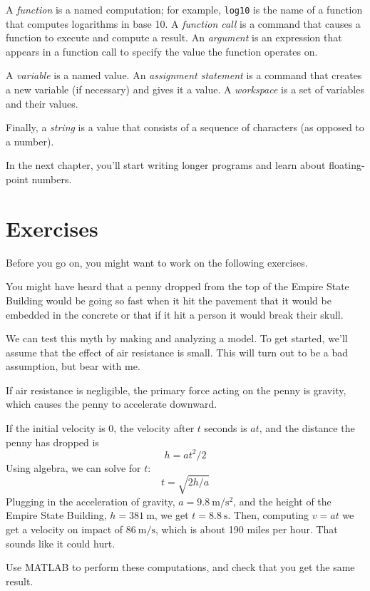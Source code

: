 A \emph{function} is a named computation; for example, \lstinline{log10} is the
name of a function that computes logarithms in base 10.
A \emph{function call} is a command that causes a function to execute and compute a result.
An \emph{argument} is an expression that appears in a function call to
specify the value the function operates on.

A \emph{variable} is a named value. An \emph{assignment statement} is a command that creates a new variable (if necessary) and gives it a value.
A \emph{workspace} is a set of variables and their values.

Finally, a \emph{string} is a value that consists of a sequence of characters (as opposed to a number).

In the next chapter, you'll start writing longer programs and learn about floating-point numbers.

\section{Exercises}

Before you go on, you might want to work on the following exercises.

\begin{ex}
\label{penny}
You might have heard that a penny dropped from the top of the Empire State Building would be going so fast when it hit the pavement that it would be embedded in the concrete or that if it hit a person it would break their skull.


We can test this myth by making and analyzing a model.  To get started, we'll assume that the effect of air resistance is small.  This will turn out to be a bad assumption, but bear with me.

If air resistance is negligible, the primary force acting on the penny is gravity, which causes the penny to accelerate downward.


If the initial velocity is 0, the velocity after $t$ seconds is $a t$, and the distance the penny has dropped is
%
\[ h = a t^2 / 2 \]
%
Using algebra, we can solve for $t$:
%
\[ t = \sqrt{ 2 h / a} \]
%
Plugging in the acceleration of gravity,
$a = \SI{9.8}{\meter\per\second\squared}$, and the height of the Empire State Building,
$h = \SI{381}{\meter}$, we get
$t = \SI{8.8}{\second}$.
Then, computing $v = a t$ we get a velocity on impact of $\SI{86}{\meter\per\second}$, which is about 190 miles per hour.  That sounds like it could hurt.

Use MATLAB to perform these computations, and check that you get the same result.
\end{ex}

